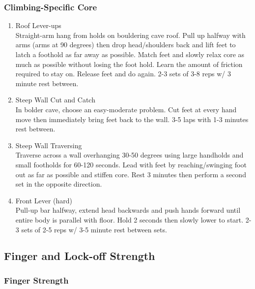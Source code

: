 \documentclass[12pt, letterpaper]{article}
\begin{document}
\subsubsection{Climbing-Specific Core}

\begin{enumerate}

    \item Roof Lever-ups \\ 
          Straight-arm hang from holds on bouldering cave roof. Pull up halfway with arms (arms at 90 degrees) then drop head/shoulders
          back and lift feet to latch a foothold as far away as possible. Match feet and slowly relax core as much as possible without
          losing the foot hold. Learn the amount of friction required to stay on. Release feet and do again. 
          2-3 sets of 3-8 reps w/ 3 minute rest between.
    \item Steep Wall Cut and Catch \\ 
          In bolder cave, choose an easy-moderate problem. Cut feet at every hand move then immediately bring feet back to the wall. 
          3-5 laps with 1-3 minutes rest between.
    \item Steep Wall Traversing \\ 
          Traverse across a wall overhanging 30-50 degrees using large handholds and small footholds for 60-120 seconds. 
          Lead with feet by reaching/swinging foot out as far as possible and stiffen core.
          Rest 3 minutes then perform a second set in the opposite direction.
    \item Front Lever (hard) \\ 
          Pull-up bar halfway, extend head backwards and push hands forward until entire body is parallel with floor. 
          Hold 2 seconds then slowly lower to start. 2-3 sets of 2-5 reps  w/ 3-5 minute rest between sets.
    
\end{enumerate}

\subsection{Finger and Lock-off Strength}

\subsubsection{Finger Strength}
\end{document}
